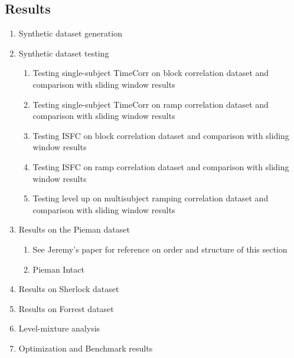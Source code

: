 \documentclass[12pt]{article}
\begin{document}
\subsection{Results}
\begin{enumerate}
\item Synthetic dataset generation
\item Synthetic dataset testing
\begin{enumerate}
\item Testing single-subject TimeCorr on block correlation dataset and comparison with sliding window results
\item Testing single-subject TimeCorr on ramp correlation dataset and comparison with sliding window results
\item Testing ISFC on block correlation dataset and comparison with sliding window results
\item Testing ISFC on ramp correlation dataset and comparison with sliding window results
\item Testing level up on multisubject ramping correlation dataset and comparison with sliding window results
\end{enumerate}
\item Results on the Pieman dataset
\begin{enumerate}
\item See Jeremy's paper for reference on order and structure of this section\\
\item Pieman Intact
\end{enumerate}
\item Results on Sherlock dataset
\item Results on Forrest dataset
\item Level-mixture analysis
\item Optimization and Benchmark results

\end{enumerate}
\end{document}
